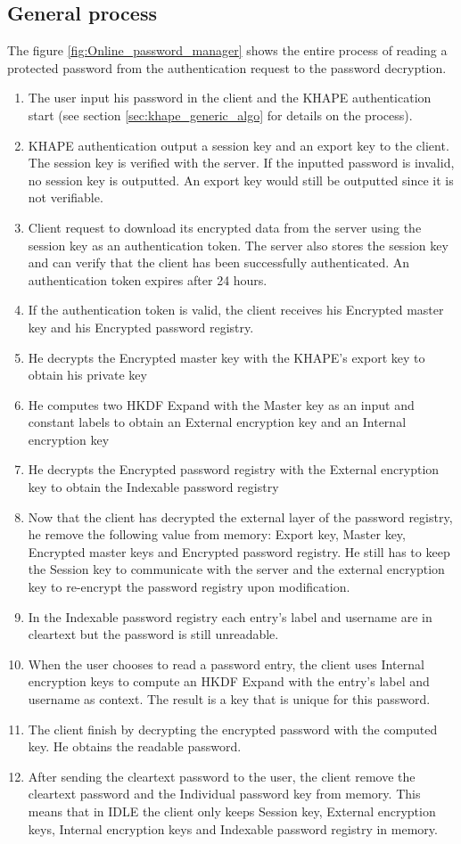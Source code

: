 ﻿\documentclass[../report.tex]{subfiles}
\begin{document}
\subsection{General process}
The figure \ref{fig:Online_password_manager} shows the entire process of reading a protected password from the authentication request to the password decryption.
\begin{enumerate}
 \item The user input his password in the client and the KHAPE authentication start (see section \ref{sec:khape_generic_algo} for details on the process).
 \item KHAPE authentication output a session key and an export key to the client. The session key is verified with the server. If the inputted password is invalid, no session key is outputted. An export key would still be outputted since it is not verifiable.
 \item Client request to download its encrypted data from the server using the session key as an authentication token. The server also stores the session key and can verify that the client has been successfully authenticated. An authentication token expires after 24 hours.
 \item If the authentication token is valid, the client receives his Encrypted master key and his Encrypted password registry.
 \item He decrypts the Encrypted master key with the KHAPE's export key to obtain his private key
 \item He computes two HKDF Expand with the Master key as an input and constant labels to obtain an External encryption key and an Internal encryption key
 \item He decrypts the Encrypted password registry with the External encryption key to obtain the Indexable password registry
 \item Now that the client has decrypted the external layer of the password registry, he remove the following value from memory: Export key, Master key, Encrypted master keys and Encrypted password registry. He still has to keep the Session key to communicate with the server and the external encryption key to re-encrypt the password registry upon modification.
 \item In the Indexable password registry each entry's label and username are in cleartext but the password is still unreadable. 
 \item When the user chooses to read a password entry, the client uses Internal encryption keys to compute an HKDF Expand with the entry's label and username as context. The result is a key that is unique for this password.
 \item The client finish by decrypting the encrypted password with the computed key. He obtains the readable password.
 \item After sending the cleartext password to the user, the client remove the cleartext password and the Individual password key from memory. This means that in IDLE the client only keeps Session key, External encryption keys, Internal encryption keys and Indexable password registry in memory.
\end{enumerate}
\end{document}

